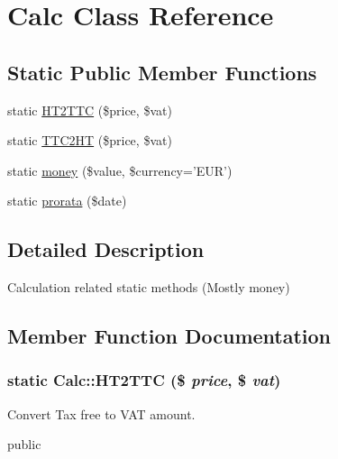 \hypertarget{classCalc}{
\section{Calc Class Reference}
\label{classCalc}
}
\subsection*{Static Public Member Functions}
\begin{CompactItemize}
\item 
static \hyperlink{classCalc_5654689f9bf3c43030b6ee27806c718a}{HT2TTC} (\$price, \$vat)
\item 
static \hyperlink{classCalc_5fd87cac52c2cc34fb22fcb732f5ee21}{TTC2HT} (\$price, \$vat)
\item 
static \hyperlink{classCalc_6e330532dcf40889cc96f09dcdcba7b4}{money} (\$value, \$currency='EUR')
\item 
static \hyperlink{classCalc_9d9aafb8e61efce896ca20bc0d2a32e3}{prorata} (\$date)
\end{CompactItemize}


\subsection{Detailed Description}
Calculation related static methods (Mostly money) 

\subsection{Member Function Documentation}
\hypertarget{classCalc_5654689f9bf3c43030b6ee27806c718a}{
\subsubsection[HT2TTC]{\setlength{\rightskip}{0pt plus 5cm}static Calc::HT2TTC (\$ {\em price}, \/  \$ {\em vat})}}
\label{classCalc_5654689f9bf3c43030b6ee27806c718a}


Convert Tax free to VAT amount.

public

